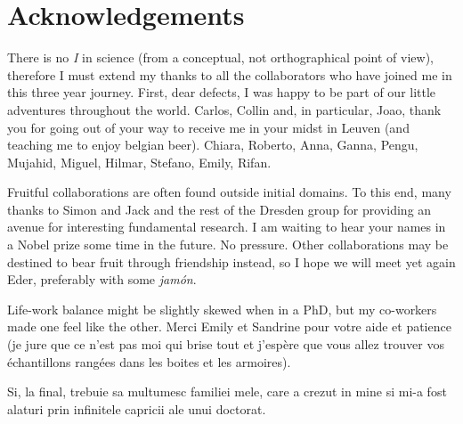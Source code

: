 
\chapter{Acknowledgements}

There is no \textit{I} in science (from a conceptual, not orthographical point of view),
therefore I must extend my thanks to all the collaborators who have joined me 
in this three year journey. First, dear defects, I was happy to be part
of our little adventures throughout the world. 
Carlos, Collin and, in particular, Joao,
thank you for going out of your way to receive me in your midst in Leuven
(and teaching me to enjoy belgian beer).
Chiara, Roberto, Anna, Ganna, Pengu, Mujahid, Miguel, Hilmar, Stefano, Emily, Rifan.

Fruitful collaborations are often found outside initial domains. To this end, many
thanks to Simon and Jack and the rest of the Dresden group for providing an 
avenue for interesting fundamental research.
I am waiting to hear your names in a Nobel prize some time in the future. No pressure.
Other collaborations may be destined to bear fruit through friendship instead,
so I hope we will meet yet again Eder, preferably with some \textit{jamón}.

Life-work balance might be slightly skewed when in a PhD, but my co-workers made 
one feel like the other. Merci Emily et Sandrine pour votre aide et patience
(je jure que ce n'est pas moi qui brise tout et j'espère que vous allez
trouver vos échantillons  rangées dans les boites et les armoires).


Si, la final, trebuie sa multumesc familiei mele, care a crezut in mine si mi-a fost
alaturi prin infinitele capricii ale unui doctorat.